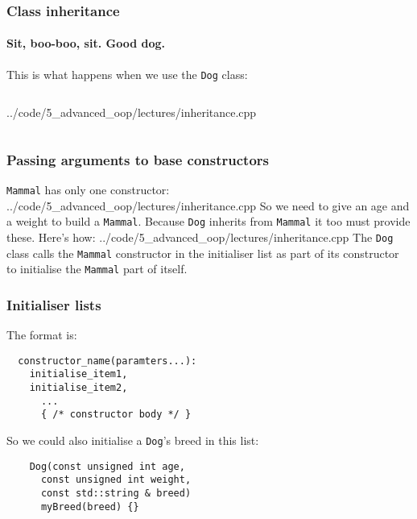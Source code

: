 \documentclass{beamer}
\begin{document}
\begin{frame}[fragile]
  \frametitle{Class inheritance}
  \framesubtitle{Sit, boo-boo, sit.  Good dog.}
  
  This is what happens when we use the \texttt{Dog} class:
  \begin{columns}[t]
    \begin{column}[T]{0.5\linewidth}
    		{../code/5_advanced_oop/lectures/inheritance.cpp}
    \end{column}
    \pause
  	\begin{column}[T]{0.48\linewidth}
  	\end{column}
  \end{columns}

\end{frame}

\begin{frame}[fragile]
  \frametitle{Passing arguments to base constructors}
  
  \texttt{Mammal} has only one constructor:
  	{../code/5_advanced_oop/lectures/inheritance.cpp}
  So we need to give an age and a weight to build a \texttt{Mammal}.  Because \texttt{Dog} inherits from \texttt{Mammal} it too must provide these.\pause{} Here's how:
  	{../code/5_advanced_oop/lectures/inheritance.cpp}  
	The \texttt{Dog} class calls the \texttt{Mammal} constructor in the initialiser list as part of its constructor to initialise the \texttt{Mammal} part of itself.

\end{frame}

\begin{frame}[fragile]
  \frametitle{Initialiser lists}
  
	
	The format is:
	\begin{lstlisting}
  constructor_name(paramters...):
    initialise_item1,
    initialise_item2,
	  ...
	  { /* constructor body */ }
	\end{lstlisting}
	So we could also initialise a \texttt{Dog}'s breed in this list:
	\begin{lstlisting}
	Dog(const unsigned int age,
	  const unsigned int weight,
	  const std::string & breed)
	  myBreed(breed) {}
	\end{lstlisting}
\end{frame}
\end{document}
